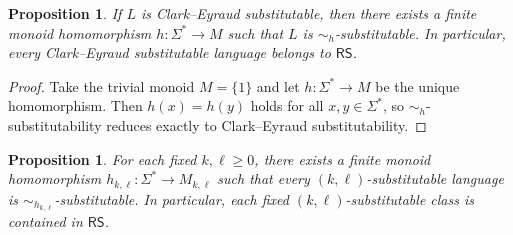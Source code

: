 \documentclass[11pt,a4paper]{article}
\newtheorem{proposition}[theorem]{Proposition}
\begin{document}
\begin{proposition}\label{prop:ce-special}
If $L$ is Clark--Eyraud substitutable, then there exists a finite monoid
homomorphism $h:\Sigma^*\to M$ such that $L$ is
$\sim_h$-substitutable. In particular, every Clark--Eyraud
substitutable language belongs to $\mathsf{RS}$.
\end{proposition}

\begin{proof}
Take the trivial monoid $M=\{1\}$ and let $h:\Sigma^*\to M$ be the
unique homomorphism. Then $h(x)=h(y)$ holds for all
$x,y\in\Sigma^*$, so $\sim_h$-substitutability reduces exactly to
Clark--Eyraud substitutability.
\end{proof}

\begin{proposition}\label{prop:yl-special}
For each fixed $k,\ell\ge0$, there exists a finite monoid homomorphism
$h_{k,\ell}:\Sigma^*\to M_{k,\ell}$ such that every
$(k,\ell)$-substitutable language is
$\sim_{h_{k,\ell}}$-substitutable. In particular, each fixed
$(k,\ell)$-substitutable class is contained in $\mathsf{RS}$.
\end{proposition}
\end{document}
